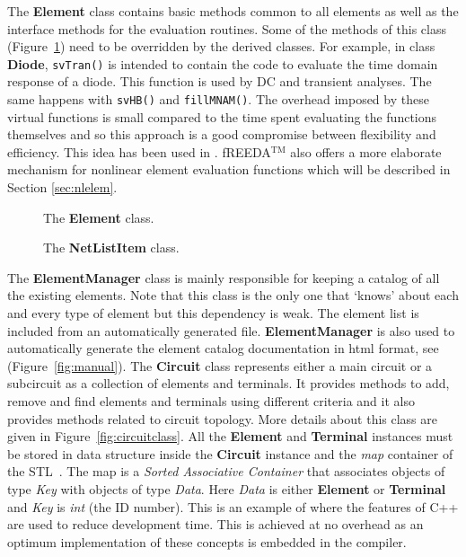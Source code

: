 The {\bf Element} class contains basic methods common to all elements
as well as the interface methods for the evaluation routines.  Some of
the methods of this class (Figure~\ref{fig:elementclass}) need to be
overridden by the derived classes. For example, in class {\bf Diode},
{\tt svTran()} is intended to contain the code to evaluate the time
domain response of a diode. This function is used by DC and transient
analyses. The same happens with {\tt svHB()} and {\tt fillMNAM()}.
The overhead imposed by these virtual functions is small compared to
the time spent evaluating the functions themselves and so this
approach is a good compromise between flexibility and efficiency. This
idea has been used in \cite{codecs,davis1,feldmann}. fREEDA$^{\mathrm{TM}}$ also
offers a more elaborate mechanism for nonlinear element evaluation
functions which will be described in Section \ref{sec:nlelem}.

%
\begin{figure}[htpb]
\centerline{\epsfxsize=6cm }
\caption{The {\bf Element} class.} \label{fig:elementclass}
\end{figure}
%

%
\begin{figure}[htpb]
\centerline{\epsfxsize=6cm }
\caption{The {\bf NetListItem} class.} \label{fig:netlistitemclass}
\end{figure}
%

The {\bf ElementManager} class is mainly responsible for keeping a
catalog of all the existing elements. Note that this class is the only
one that `knows' about each and every type of element but this
dependency is weak.  The element list is included from an
automatically generated file.  {\bf ElementManager} is also used to
automatically generate the element catalog documentation in html
format, see (Figure~\ref{fig:manual}).  The {\bf Circuit} class
represents either a main circuit or a subcircuit as a collection of
elements and terminals. It provides methods to add, remove and find
elements and terminals using different criteria and it also provides
methods related to circuit topology. More details about this class are
given in Figure~\ref{fig:circuitclass}.  All the {\bf Element} and
{\bf Terminal} instances must be stored in data structure inside the
{\bf Circuit} instance and the \emph{map} container of the
STL~\cite{STL}. The map is a \emph{Sorted Associative Container} that
associates objects of type \emph{Key} with objects of type
\emph{Data}. Here \emph{Data} is either {\bf Element} or {\bf
Terminal} and \emph{Key} is \emph{int} (the ID number). This is an
example of where the features of C++ are used to reduce development
time. This is achieved at no overhead as an optimum implementation of
these concepts is embedded in the compiler.

